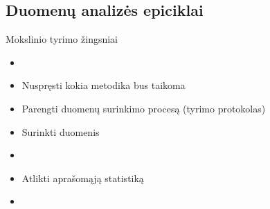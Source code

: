 \documentclass[11pt,xcolor=table]{beamer}
\begin{document}
\subsection{Duomenų analizės epiciklai}

\begin{frame}{Mokslinio tyrimo žingsniai}
\begin{itemize}
\item {\color{blue}{Išvystyti klausimą / hipotezę}}
\item Nuspręsti kokia metodika bus taikoma
\item Parengti duomenų surinkimo procesą (tyrimo protokolas)
\item Surinkti duomenis
\item {\color{blue}{Atlikti tiriamąją statistiką}}
\item Atlikti aprašomąją statistiką
\item {\color{blue}{Modeliuoti, atlikti prognozes
\item Interpretuoti rezultatus
\item Aprašyti tyrimo eigą bei rezultatus}}
\end{itemize}
\end{frame}
\end{document}
